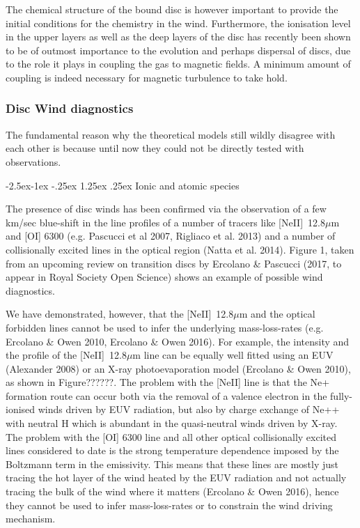 \documentclass[10pt,fleqn,twoside]{article}
\makeatletter
\renewcommand\paragraph{\@startsection{paragraph}{4}{\z@}%
            {-2.5ex\@plus -1ex \@minus -.25ex}%
            {1.25ex \@plus .25ex}%
            {\normalfont\normalsize\bfseries}}
\makeatother
\begin{document}
The chemical structure of the bound disc is however important to provide the initial conditions for the chemistry in the wind. Furthermore, the ionisation level in the upper layers as well as the deep layers of the disc has recently been shown to be of outmost importance to the evolution and perhaps dispersal of discs, due to the role it plays in coupling the gas to magnetic fields. A minimum amount of coupling is indeed necessary for magnetic turbulence to take hold.


\subsubsection{Disc Wind diagnostics}


The fundamental reason why the theoretical models still wildly
disagree with each other is because until now they could not be
directly tested with observations.

\paragraph{Ionic and atomic species}

The presence of disc winds has been confirmed via the
observation of a few km/sec blue-shift in the line profiles of a
number of tracers like [NeII]~12.8$\mu$m and [OI] 6300 (e.g. Pascucci
et al 2007, Rigliaco et al. 2013) and a number of collisionally excited lines in the optical
region (Natta et al. 2014). Figure 1, taken from an upcoming review on transition discs by
Ercolano \& Pascucci (2017, to appear in Royal Society Open Science)
shows an example of possible wind diagnostics.  


We have demonstrated, however, that the  [NeII]~12.8$\mu$m and the
optical forbidden lines 
cannot be used to infer the underlying 
mass-loss-rates (e.g. Ercolano \& Owen 2010, Ercolano \& Owen 2016). 
 For example, the intensity and the profile of the [NeII]~12.8$\mu$m line
 can be equally well fitted using an EUV (Alexander 2008) or an X-ray
 photoevaporation model (Ercolano \& Owen 2010), as shown in
 Figure??????. The problem with the 
 [NeII] line is that the Ne+ formation route can occur both via the
 removal of a valence electron in the fully-ionised winds driven by
 EUV radiation, but also by charge exchange of Ne++ with neutral H
 which is abundant in the quasi-neutral winds driven by X-ray. 
The problem with the [OI] 6300 line and all other optical collisionally
excited lines considered to date is the strong temperature dependence
imposed by the Boltzmann term in the emissivity. This means that these
lines are mostly just tracing the hot layer of the wind heated by the
EUV radiation and not actually tracing the bulk of the wind where it
matters (Ercolano \& Owen 2016), hence they
cannot be used to infer mass-loss-rates or to constrain the wind
driving mechanism.   
\end{document}
